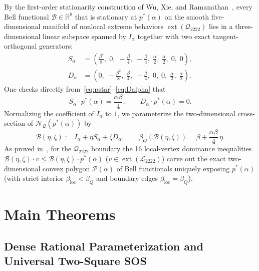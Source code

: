 \documentclass[11pt,a4paper]{article}
\newcommand{\RR}{\mathbb{R}}
\newcommand{\calQ}{\mathcal{Q}_{2222}}
\newcommand{\calL}{\mathcal{L}_{2222}}
\newcommand{\calN}{\mathcal{N}_{\mathcal{Q}}}
\newcommand{\calP}{\mathcal{P}}
\newcommand{\calB}{\mathcal{B}}
\newcommand{\ext}{\operatorname{ext}}
\begin{document}
By the first-order stationarity construction of Wu, Xie, and Ramanathan~\cite{wu2026normalcone}, every Bell functional $\calB \in \RR^8$ that is stationary at $p^*(\alpha)$ on the smooth five-dimensional manifold of nonlocal extreme behaviors $\ext(\calQ)$ lies in a three-dimensional linear subspace spanned by $I_\alpha$ together with two exact tangent-orthogonal generators:
\begin{align}
  S_\alpha &= \left(\frac{\beta^2}{8},\; 0,\; -\frac{\beta}{4},\; -\frac{\beta}{4},\; \frac{\alpha}{2},\; \frac{\alpha}{2},\; 0,\; 0\right), \label{eq:Salpha}\\
  D_\alpha &= \left(0,\; -\frac{\beta^2}{8},\; \frac{\beta}{4},\; -\frac{\beta}{4},\; 0,\; 0,\; \frac{\alpha}{2},\; \frac{\alpha}{2}\right). \label{eq:Dalpha}
\end{align}
One checks directly from~\eqref{eq:pstar}--\eqref{eq:Dalpha} that
\begin{equation}
  S_\alpha \cdot p^*(\alpha) = \frac{\alpha\beta}{4}, \qquad D_\alpha \cdot p^*(\alpha) = 0.
\end{equation}
Normalizing the coefficient of $I_\alpha$ to $1$, we parameterize the two-dimensional cross-section of $\calN(p^*(\alpha))$ by
\begin{equation}
  \calB(\eta,\zeta) := I_\alpha + \eta S_\alpha + \zeta D_\alpha, \qquad \beta_Q(\calB(\eta,\zeta)) = \beta + \frac{\alpha\beta}{4}\,\eta.
  \label{eq:B-etazeta}
\end{equation}
As proved in~\cite{wu2026normalcone}, for the $\calQ$ boundary the 16 local-vertex dominance inequalities $\calB(\eta,\zeta) \cdot v \le \calB(\eta,\zeta) \cdot p^*(\alpha)$ ($v \in \ext(\calL)$) carve out the exact two-dimensional convex polygon $\calP(\alpha)$ of Bell functionals uniquely exposing $p^*(\alpha)$ (with strict interior $\beta_{\mathrm{loc}} < \beta_Q$ and boundary edges $\beta_{\mathrm{loc}} = \beta_Q$).

\section{Main Theorems}
\label{sec:theorems}

\subsection{Dense Rational Parameterization and Universal Two-Square SOS}
\end{document}

